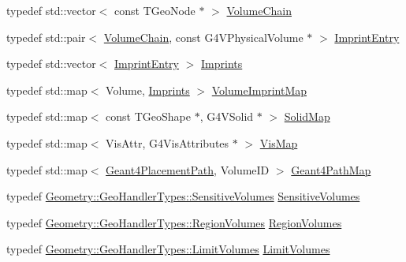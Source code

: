 \begin{DoxyCompactItemize}
\item 
typedef std::vector$<$ const TGeoNode $\ast$ $>$ \hyperlink{namespace_d_d4hep_1_1_simulation_1_1_geant4_geometry_maps_a23aa6ab8c70ef8f0c800d00db6a7bb53}{VolumeChain}
\item 
typedef std::pair$<$ \hyperlink{namespace_d_d4hep_1_1_simulation_1_1_geant4_geometry_maps_a23aa6ab8c70ef8f0c800d00db6a7bb53}{VolumeChain}, const G4VPhysicalVolume $\ast$ $>$ \hyperlink{namespace_d_d4hep_1_1_simulation_1_1_geant4_geometry_maps_ab7b5bc15fa7417d422647be899d10c88}{ImprintEntry}
\item 
typedef std::vector$<$ \hyperlink{namespace_d_d4hep_1_1_simulation_1_1_geant4_geometry_maps_ab7b5bc15fa7417d422647be899d10c88}{ImprintEntry} $>$ \hyperlink{namespace_d_d4hep_1_1_simulation_1_1_geant4_geometry_maps_a44385b9a0b879f5b5a4f11c606cbd968}{Imprints}
\item 
typedef std::map$<$ Volume, \hyperlink{namespace_d_d4hep_1_1_simulation_1_1_geant4_geometry_maps_a44385b9a0b879f5b5a4f11c606cbd968}{Imprints} $>$ \hyperlink{namespace_d_d4hep_1_1_simulation_1_1_geant4_geometry_maps_aade714d6f596f4d83009dcc2f3968d86}{VolumeImprintMap}
\item 
typedef std::map$<$ const TGeoShape $\ast$, G4VSolid $\ast$ $>$ \hyperlink{namespace_d_d4hep_1_1_simulation_1_1_geant4_geometry_maps_a5591dbffcd2e6432004034209abd630e}{SolidMap}
\item 
typedef std::map$<$ VisAttr, G4VisAttributes $\ast$ $>$ \hyperlink{namespace_d_d4hep_1_1_simulation_1_1_geant4_geometry_maps_af7bb137248b77047dc34ff68d67225eb}{VisMap}
\item 
typedef std::map$<$ \hyperlink{namespace_d_d4hep_1_1_simulation_1_1_geant4_geometry_maps_a8a325934adb143cb1cbc47dd030395ed}{Geant4PlacementPath}, VolumeID $>$ \hyperlink{namespace_d_d4hep_1_1_simulation_1_1_geant4_geometry_maps_a3d68bbc4e8d7a581a15f66d773dac6e7}{Geant4PathMap}
\item 
typedef \hyperlink{class_d_d4hep_1_1_geometry_1_1_geo_handler_types_a530cdc551e68a5f975fe294329d27e63}{Geometry::GeoHandlerTypes::SensitiveVolumes} \hyperlink{namespace_d_d4hep_1_1_simulation_1_1_geant4_geometry_maps_a4b4bd41ff250c41737c7a73223fab910}{SensitiveVolumes}
\item 
typedef \hyperlink{class_d_d4hep_1_1_geometry_1_1_geo_handler_types_a8e121c3a06f16781bbabba4528136654}{Geometry::GeoHandlerTypes::RegionVolumes} \hyperlink{namespace_d_d4hep_1_1_simulation_1_1_geant4_geometry_maps_a9fc457ad93d6235197e7e1ab013d1f56}{RegionVolumes}
\item 
typedef \hyperlink{class_d_d4hep_1_1_geometry_1_1_geo_handler_types_ad8397c24589a1508baf0735bdb2b3c77}{Geometry::GeoHandlerTypes::LimitVolumes} \hyperlink{namespace_d_d4hep_1_1_simulation_1_1_geant4_geometry_maps_a3b9008449a71468a115373b9819457df}{LimitVolumes}
\end{DoxyCompactItemize}
